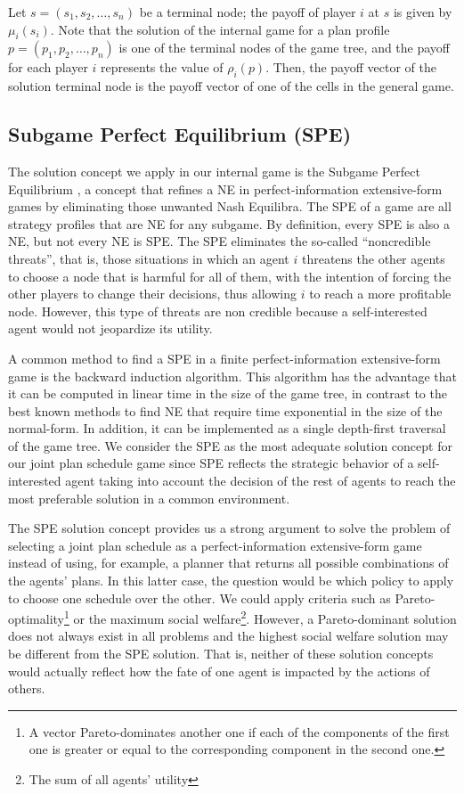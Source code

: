 \documentclass[letterpaper]{article}
\begin{document}
Let $s=(s_1, s_2, \ldots, s_n)$ be a terminal node; the payoff of player $i$ at $s$ is given by $\mu_i(s_i)$. Note that the solution of the internal game for a plan profile $p=(p_1, p_2, \ldots, p_n)$ is one of the terminal nodes of the game tree, and the payoff for each player $i$ represents the value of $\rho_i(p)$. Then, the payoff vector of the solution terminal node is the payoff vector of one of the cells in the general game.

\subsection{Subgame Perfect Equilibrium (SPE)}

The solution concept we apply in our internal game is the Subgame Perfect Equilibrium \cite[Chapter 5]{Shoham09}, a concept that refines a NE in perfect-information extensive-form games by eliminating those unwanted Nash Equilibra. The SPE of a game are all strategy profiles that are NE for any subgame. By definition, every SPE is also a NE, but not every NE is SPE. The SPE eliminates the so-called ``noncredible threats'', that is, those situations in which an agent $i$ threatens the other agents to choose a node that is harmful for all of them, with the intention of forcing the other players to change their decisions, thus allowing $i$ to reach a more profitable node. However, this type of threats are non credible because a self-interested agent would not jeopardize its utility.

A common method to find a SPE in a finite perfect-information extensive-form game is the backward induction algorithm. This algorithm has the advantage that it can be computed in linear time in the size of the game tree, in contrast to the best known methods to find NE that require time exponential in the size of the normal-form. In addition, it can be implemented as a single depth-first traversal of the game tree. We consider the SPE as the most adequate solution concept for our joint plan schedule game since SPE reflects the strategic behavior of a self-interested agent taking into account the decision of the rest of agents to reach the most preferable solution in a common environment.

The SPE solution concept provides us a strong argument to solve the problem of selecting a joint plan schedule as a perfect-information extensive-form game instead of using, for example, a planner that returns all possible combinations of the agents' plans. In this latter case, the question would be which policy to apply to choose one schedule over the other. We could apply criteria such as Pareto-optimality\footnote{A vector Pareto-dominates another one if each of the components of the first one is greater or equal to the corresponding component in the second one.} or the maximum social welfare\footnote{The sum of all agents' utility}. However, a Pareto-dominant solution does not always exist in all problems and the highest social welfare solution may be different from the SPE solution. That is, neither of these solution concepts would actually reflect how the fate of one agent is impacted by the actions of others.
\end{document}
